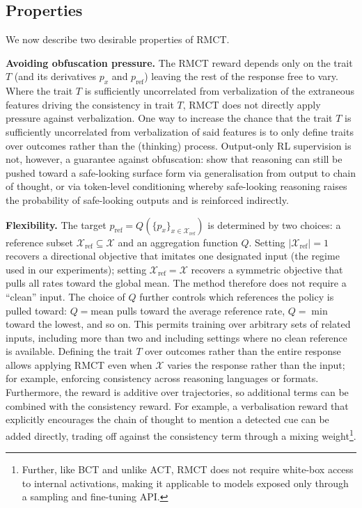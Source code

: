 \documentclass{article}
\begin{document}
\subsection{Properties}

We now describe two desirable properties of RMCT.

\textbf{Avoiding obfuscation pressure.}
The RMCT reward depends only on the trait $T$ (and its derivatives $p_x$ and $p_{\text{ref}}$) leaving the rest of the response free to vary. Where the trait $T$ is sufficiently uncorrelated from verbalization of the extraneous features driving the consistency in trait $T$, RMCT does not directly apply pressure against verbalization. One way to increase the chance that the trait $T$ is sufficiently uncorrelated from verbalization of said features is to only define traits over outcomes rather than the (thinking) process. Output-only RL supervision is not, however, a guarantee against obfuscation: \citet{drori2025outputsupervisionobfuscatechain} show that reasoning can still be pushed toward a safe-looking surface form via generalisation from output to chain of thought, or via token-level conditioning whereby safe-looking reasoning raises the probability of safe-looking outputs and is reinforced indirectly.

\textbf{Flexibility.} 
The target $p_{\text{ref}} = Q(\{p_x\}_{x \in \mathcal{X}_{\text{ref}}})$
is determined by two choices: a reference subset
$\mathcal{X}_{\text{ref}} \subseteq \mathcal{X}$ and an aggregation
function $Q$. Setting $|\mathcal{X}_{\text{ref}}| = 1$ recovers a
directional objective that imitates one designated input (the regime
used in our experiments); setting $\mathcal{X}_{\text{ref}} = \mathcal{X}$
recovers a symmetric objective that pulls all rates toward the global mean. The method therefore does not require a
``clean'' input. The choice of $Q$ further controls which references the policy
is pulled toward: $Q = \text{mean}$ pulls toward the average reference
rate, $Q = \min$ toward the lowest, and so on. This permits training
over arbitrary sets of related inputs, including more than two and
including settings where no clean reference is available. Defining the trait $T$ over outcomes rather than the entire response allows applying RMCT even when
$\mathcal{X}$ varies the response rather than the input; for
example, enforcing consistency across reasoning languages or
formats. Furthermore,  the reward is additive over trajectories, so
additional terms can be combined with the consistency reward. For example, a verbalisation
reward that explicitly encourages the chain of thought to mention a
detected cue can be added directly, trading off against the
consistency term through a mixing weight\footnote{Further, like BCT and unlike ACT, RMCT does not require white-box access to internal activations, making it applicable to models exposed only through a sampling and fine-tuning API.}.
\end{document}
